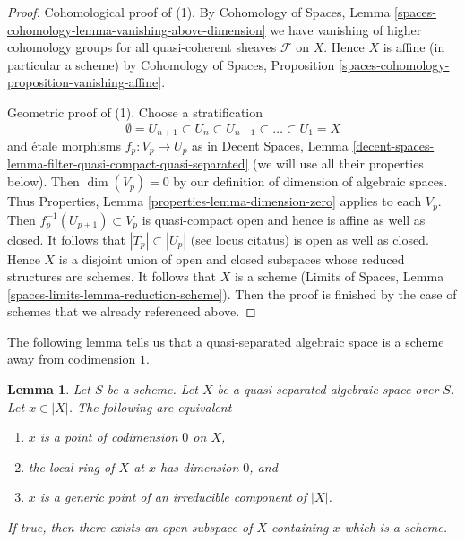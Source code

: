 \documentclass{stacks-project}
\theoremstyle{plain}
\newtheorem{lemma}[subsection]{Lemma}
\theoremstyle{definition}
\theoremstyle{remark}
\numberwithin{equation}{subsection}
\begin{document}
\begin{proof}
\medskip\noindent
Cohomological proof of (1). By Cohomology of Spaces, Lemma
\ref{spaces-cohomology-lemma-vanishing-above-dimension}
we have vanishing of higher cohomology groups for all
quasi-coherent sheaves $\mathcal{F}$ on $X$. Hence $X$
is affine (in particular a scheme) by
Cohomology of Spaces, Proposition
\ref{spaces-cohomology-proposition-vanishing-affine}.

\medskip\noindent
Geometric proof of (1). Choose a stratification
$$
\emptyset = U_{n + 1} \subset
U_n \subset U_{n - 1} \subset \ldots \subset U_1 = X
$$
and \'etale morphisms $f_p : V_p \to U_p$ as in
Decent Spaces, Lemma
\ref{decent-spaces-lemma-filter-quasi-compact-quasi-separated}
(we will use all their properties below).
Then $\dim(V_p) = 0$ by our definition of dimension of algebraic
spaces. Thus Properties, Lemma \ref{properties-lemma-dimension-zero}
applies to each $V_p$. Then $f_p^{-1}(U_{p + 1}) \subset V_p$
is quasi-compact open and hence is affine as well as closed.
It follows that $|T_p| \subset |U_p|$ (see locus citatus)
is open as well as closed. Hence $X$ is a disjoint union
of open and closed subspaces whose reduced structures are schemes.
It follows that $X$ is a scheme
(Limits of Spaces, Lemma \ref{spaces-limits-lemma-reduction-scheme}).
Then the proof is finished by the case of schemes that we
already referenced above.
\end{proof}

\noindent
The following lemma tells us that a quasi-separated algebraic space
is a scheme away from codimension $1$.

\begin{lemma}
\label{lemma-generic-point-in-schematic-locus}
Let $S$ be a scheme. Let $X$ be a quasi-separated algebraic space over $S$.
Let $x \in |X|$. The following are equivalent
\begin{enumerate}
\item $x$ is a point of codimension $0$ on $X$,
\item the local ring of $X$ at $x$ has dimension $0$, and
\item $x$ is a generic point of an irreducible component of $|X|$.
\end{enumerate}
If true, then there exists an open subspace of $X$
containing $x$ which is a scheme.
\end{lemma}
\end{document}
